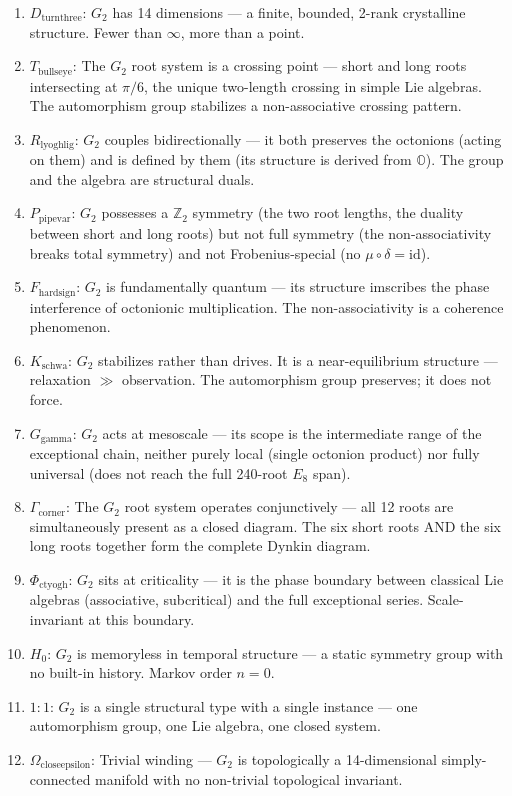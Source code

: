 \documentclass[12pt,a4paper]{article}
\begin{document}
\begin{enumerate}
    \item \textbf{$D_{\text{turnthree}}$}: $G_2$ has 14 dimensions --- a finite, bounded, 2-rank crystalline structure. Fewer than $\infty$, more than a point.
    \item \textbf{$T_{\text{bullseye}}$}: The $G_2$ root system is a crossing point --- short and long roots intersecting at $\pi/6$, the unique two-length crossing in simple Lie algebras. The automorphism group stabilizes a non-associative crossing pattern.
    \item \textbf{$R_{\text{lyoghlig}}$}: $G_2$ couples bidirectionally --- it both preserves the octonions (acting on them) and is defined by them (its structure is derived from $\mathbb{O}$). The group and the algebra are structural duals.
    \item \textbf{$P_{\text{pipevar}}$}: $G_2$ possesses a $\mathbb{Z}_2$ symmetry (the two root lengths, the duality between short and long roots) but not full symmetry (the non-associativity breaks total symmetry) and not Frobenius-special (no $\mu \circ \delta = \text{id}$).
    \item \textbf{$F_{\text{hardsign}}$}: $G_2$ is fundamentally quantum --- its structure imscribes the phase interference of octonionic multiplication. The non-associativity is a coherence phenomenon.
    \item \textbf{$K_{\text{schwa}}$}: $G_2$ stabilizes rather than drives. It is a near-equilibrium structure --- relaxation $\gg$ observation. The automorphism group preserves; it does not force.
    \item \textbf{$G_{\text{gamma}}$}: $G_2$ acts at mesoscale --- its scope is the intermediate range of the exceptional chain, neither purely local (single octonion product) nor fully universal (does not reach the full 240-root $E_8$ span).
    \item \textbf{$\Gamma_{\text{corner}}$}: The $G_2$ root system operates conjunctively --- all 12 roots are simultaneously present as a closed diagram. The six short roots AND the six long roots together form the complete Dynkin diagram.
    \item \textbf{$\Phi_{\text{ctyogh}}$}: $G_2$ sits at criticality --- it is the phase boundary between classical Lie algebras (associative, subcritical) and the full exceptional series. Scale-invariant at this boundary.
    \item \textbf{$H_0$}: $G_2$ is memoryless in temporal structure --- a static symmetry group with no built-in history. Markov order $n=0$.
    \item \textbf{$1{:}1$}: $G_2$ is a single structural type with a single instance --- one automorphism group, one Lie algebra, one closed system.
    \item \textbf{$\Omega_{\text{closeepsilon}}$}: Trivial winding --- $G_2$ is topologically a 14-dimensional simply-connected manifold with no non-trivial topological invariant.
\end{enumerate}
\end{document}
